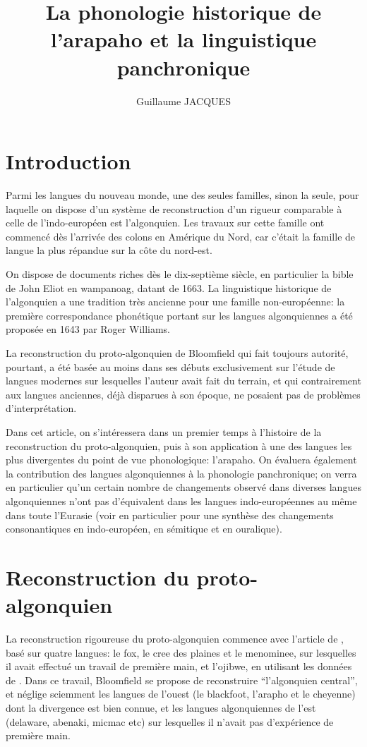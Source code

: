 \documentclass[twoside,a4paper,11pt]{article}
\newcommand{\Σ}{\greek{Σ}}
\begin{document}
\title{La phonologie historique de l'arapaho et la linguistique panchronique }

\author{Guillaume JACQUES }
\maketitle

\section{Introduction}
 	Parmi les langues du nouveau monde, une des seules familles, sinon la seule, pour laquelle on dispose d'un système de reconstruction d'un rigueur comparable à celle de l'indo-européen est l'algonquien. Les travaux sur cette famille ont commencé dès l'arrivée des colons en Amérique du Nord, car c'était la famille de langue la plus répandue sur la côte du nord-est. 
 	
	On dispose de documents riches dès le dix-septième siècle, en particulier la bible de John Eliot en wampanoag, datant de 1663. La linguistique historique de l'algonquien a une tradition très ancienne pour une famille non-européenne: la première correspondance phonétique portant sur les langues algonquiennes a été proposée en 1643 par Roger Williams.
	
	
	La reconstruction du proto-algonquien de Bloomfield qui fait toujours autorité, pourtant, a été basée au moins dans ses débuts exclusivement sur l'étude de langues modernes sur lesquelles l'auteur avait fait du terrain, et qui contrairement aux langues anciennes, déjà disparues à son époque, ne posaient pas de problèmes d'interprétation.
	
	Dans cet article, on s'intéressera dans un premier temps à l'histoire de la reconstruction du proto-algonquien, puis à son application à une des langues les plus divergentes du point de vue phonologique: l'arapaho. On évaluera également la contribution des langues algonquiennes à la phonologie panchronique; on verra en particulier qu'un certain nombre de changements observé dans diverses langues algonquiennes n'ont pas d'équivalent dans les langues indo-européennes au même dans toute l'Eurasie (voir en particulier \citet{kuemmel07wandel} pour une synthèse des changements consonantiques en indo-européen,  en sémitique et en ouralique).
	
\section{Reconstruction du proto-algonquien}	
La reconstruction rigoureuse du proto-algonquien commence avec l'article de \citet{bloomfield25central}, basé sur quatre langues: le fox, le cree des plaines et le menominee, sur lesquelles il avait effectué un travail de première main, et l'ojibwe, en utilisant les données de \citet{jones17ojibwe}. Dans ce travail, Bloomfield se propose de reconstruire ``l'algonquien central'', et néglige sciemment les langues de l'ouest (le blackfoot, l'arapho et le cheyenne) dont la divergence est bien connue, et les langues algonquiennes de l'est (delaware, abenaki, micmac etc) sur lesquelles il n'avait pas d'expérience de première main.
\end{document}
